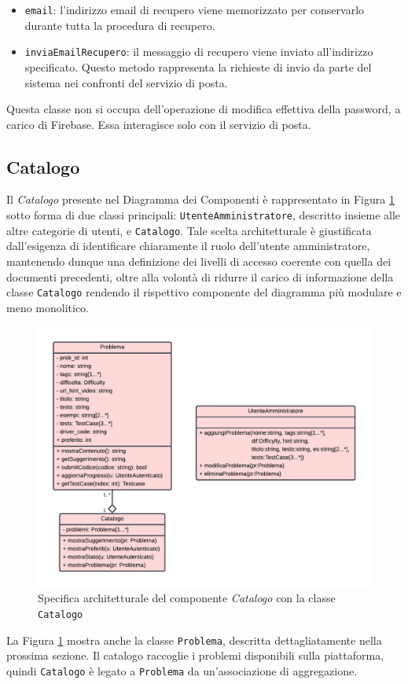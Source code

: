 \documentclass[11pt, a4paper]{article}
\theoremstyle{definition} %
\begin{document}
\begin{itemize}
    \item \texttt{email}: l'indirizzo email di recupero viene memorizzato
    per conservarlo durante tutta la procedura di recupero.

    \item \texttt{inviaEmailRecupero}: il messaggio di recupero viene inviato
    all'indirizzo specificato. Questo metodo rappresenta la richieste di
    invio da parte del sistema nei confronti del servizio di posta.
\end{itemize}
Questa classe non si occupa dell'operazione di modifica effettiva della
password, a carico di Firebase. Essa interagisce solo con il servizio
di posta.



\newpage
\subsection{Catalogo}
Il \textit{Catalogo} presente nel Diagramma dei Componenti è rappresentato in
Figura \ref{catalog} sotto forma di due classi principali: \texttt{UtenteAmministratore}, descritto insieme
alle altre categorie di utenti, e \texttt{Catalogo}. Tale scelta architetturale
è giustificata dall'esigenza di identificare chiaramente il ruolo dell'utente
amministratore, mantenendo dunque una definizione dei livelli di accesso
coerente con quella dei documenti precedenti, oltre alla volontà di ridurre il
carico di informazione della classe \texttt{Catalogo} rendendo il rispettivo
componente del diagramma più modulare e meno monolitico.

\begin{figure}[H]
\centering
\hspace*{-3cm}
\includegraphics[scale = 0.9]{materiale/class-catalogo.pdf}
\caption{Specifica architetturale del componente \textit{Catalogo} con la classe \texttt{Catalogo}}
\label{catalog}
\end{figure}
\noindent La Figura \ref{catalog} mostra anche la classe \texttt{Problema},
descritta dettagliatamente nella prossima sezione. Il catalogo
raccoglie i problemi disponibili sulla piattaforma, quindi \texttt{Catalogo}
è legato a \texttt{Problema} da un'associazione di aggregazione.
\end{document}
